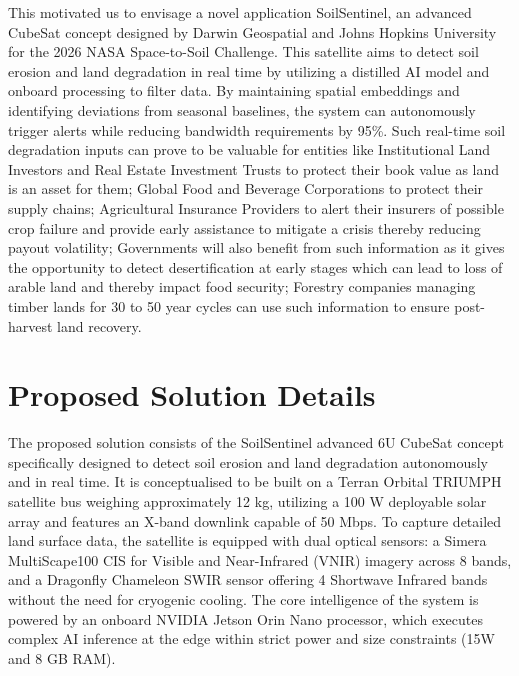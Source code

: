\documentclass[11pt,letterpaper]{article}
\theoremstyle{plain}
\theoremstyle{definition}
\theoremstyle{remark}
\begin{document}
This motivated us to envisage a novel application SoilSentinel, an advanced CubeSat concept designed by Darwin Geospatial and Johns Hopkins University for the 2026 NASA Space-to-Soil Challenge. This satellite aims to detect soil erosion and land degradation in real time by utilizing a distilled AI model and onboard processing to filter data. By maintaining spatial embeddings and identifying deviations from seasonal baselines, the system can autonomously trigger alerts while reducing bandwidth requirements by 95\%. Such real-time soil degradation inputs can prove to be valuable for entities like Institutional Land Investors and Real Estate Investment Trusts to protect their book value as land is an asset for them; Global Food and Beverage Corporations to protect their supply chains; Agricultural Insurance Providers to alert their insurers of possible crop failure and provide early assistance to mitigate a crisis thereby reducing payout volatility; Governments will also benefit from such information as it gives the opportunity to detect desertification at early stages which can lead to loss of arable land and thereby impact food security; Forestry companies managing timber lands for 30 to 50 year cycles can use such information to ensure post-harvest land recovery.



\section{Proposed Solution Details}
The proposed solution consists of the SoilSentinel advanced 6U CubeSat concept specifically designed to detect soil erosion and land degradation autonomously and in real time. It is conceptualised to be built on a Terran Orbital TRIUMPH satellite bus weighing approximately 12 kg,  utilizing a 100 W deployable solar array and features an X-band downlink capable of 50 Mbps. To capture detailed land surface data, the satellite is equipped with dual optical sensors: a Simera MultiScape100 CIS for Visible and Near-Infrared (VNIR) imagery across 8 bands, and a Dragonfly Chameleon SWIR sensor offering 4 Shortwave Infrared bands without the need for cryogenic cooling. The core intelligence of the system is powered by an onboard NVIDIA Jetson Orin Nano processor, which executes complex AI inference at the edge within strict power and size constraints (15W and 8 GB RAM).
\end{document}
